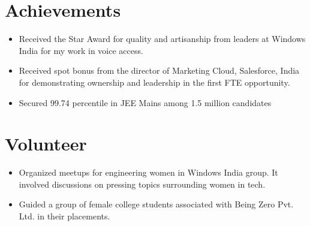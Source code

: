 \documentclass[letterpaper,11pt]{article}
\newcommand{\listItem}[1]{
  \item\small{{#1 \vspace{-2pt}}
  }
}
\newcommand{\resumeSubHeadingListStart}{\begin{itemize}[leftmargin=*]}
\newcommand{\resumeSubHeadingListEnd}{\end{itemize}}
\newcommand{\resumeListItem}[1]{\listItem{#1}\vspace{-4pt}}
\begin{document}
\section{Achievements}
 \resumeSubHeadingListStart
   \resumeListItem
      {Received the Star Award for quality and artisanship from leaders at Windows India for my work in voice access.}
    \resumeListItem
      {Received spot bonus from the director of Marketing Cloud, Salesforce, India for demonstrating ownership and leadership in the first FTE opportunity.}
    \resumeListItem
      {Secured 99.74 percentile in JEE Mains among 1.5 million candidates}
 \resumeSubHeadingListEnd
 
 
\section{Volunteer}
 \resumeSubHeadingListStart
   \resumeListItem
      {Organized meetups for engineering women in Windows India group. It involved discussions on pressing topics surrounding women in tech.}
    \resumeListItem
      {Guided a group of female college students associated with Being Zero Pvt. Ltd. in their placements.}
 \resumeSubHeadingListEnd
 
 
\end{document}
